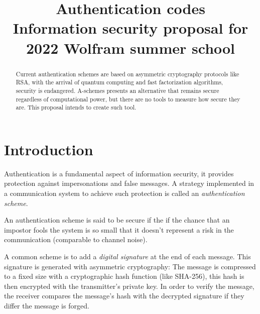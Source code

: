 \documentclass[conference]{IEEEtran}
\begin{document}
\title{
Authentication codes  \\
{\footnotesize Information security proposal for 2022 Wolfram summer school}
}

\author{
}

\maketitle

\begin{abstract}
    Current authentication schemes are based on asymmetric cryptography protocols like RSA, with the arrival of quantum computing and fast factorization algorithms, security is endangered. A-schemes presents an alternative that remains secure regardless of computational power, but there are no tools to measure how secure they are. This proposal intends to create such tool.
\end{abstract}


%
%
\section{Introduction}
Authentication is a fundamental aspect of information security, it provides protection against impersonations and false messages. A strategy implemented in a communication system to achieve such protection is called an \textit{authentication scheme}.

An authentication scheme is said to be secure if the if the chance that an impostor fools the system is so small that it doesn't represent a risk in the communication (comparable to channel noise).

A common scheme is to add a \textit{digital signature} at the end of each message. This signature is generated with asymmetric cryptography: The message is compressed to a fixed size with a cryptographic hash function (like SHA-256), this hash is then encrypted with the transmitter's private key. In order to verify the message, the receiver compares the message's hash with the decrypted signature if they differ the message is forged.
\end{document}
